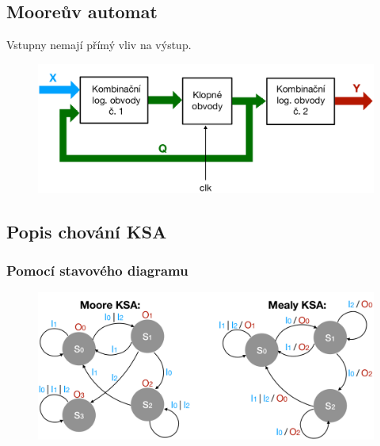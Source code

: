 \subsection{Mooreův automat}
Vstupny nemají přímý vliv na výstup.
\begin{figure}[h!]
    \centering
    \includegraphics*[scale = 0.3]{img/Moore.png}
\end{figure}

\subsection{Popis chování KSA}
\subsubsection{Pomocí stavového diagramu}
\begin{figure}[h!]
    \centering
    \includegraphics[scale = 0.3]{img/Diagram.png}
\end{figure}

